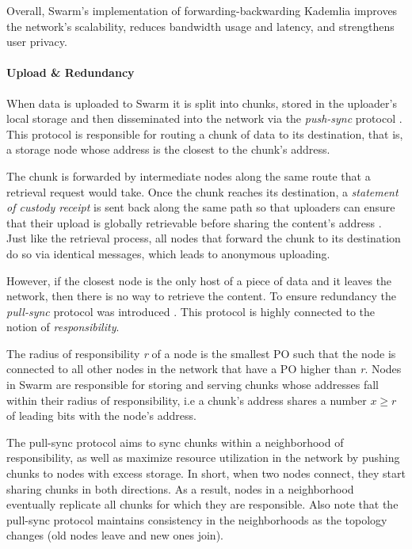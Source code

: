 Overall, Swarm's implementation of forwarding-backwarding Kademlia improves the network's scalability, reduces bandwidth usage and latency, and strengthens user privacy.

\paragraph{Upload \& Redundancy}\label{par:upload_swarm}
When data is uploaded to Swarm it is split into chunks, stored in the uploader's local storage and then disseminated into the network via the \textit{push-sync} protocol \citep{swarm_team_2021}. This protocol is responsible for routing a chunk of data to its destination, that is, a storage node whose address is the closest to the chunk's address.

The chunk is forwarded by intermediate nodes along the same route that a retrieval request would take. Once the chunk reaches its destination, a \textit{statement of custody receipt} is sent back along the same path so that uploaders can ensure that their upload is globally retrievable before sharing the content's address \citep[p.~47]{tron_2020}. Just like the retrieval process, all nodes that forward the chunk to its destination do so via identical messages, which leads to anonymous uploading.

However, if the closest node is the only host of a piece of data and it leaves the network, then there is no way to retrieve the content. To ensure redundancy the \textit{pull-sync} protocol was introduced \citep{swarm_team_2021}. This protocol is highly connected to the notion of \textit{responsibility}.

The radius of responsibility \textit{r} of a node is the smallest PO such that the node is connected to all other nodes in the network that have a PO higher than \textit{r}. Nodes in Swarm are responsible for storing and serving chunks whose addresses fall within their radius of responsibility, i.e a chunk's address shares a number $x \geq r$ of leading bits with the node's address.

The pull-sync protocol aims to sync chunks within a neighborhood of responsibility, as well as maximize resource utilization in the network by pushing chunks to nodes with excess storage. In short, when two nodes connect, they start sharing chunks in both directions. As a result, nodes in a neighborhood eventually replicate all chunks for which they are responsible. Also note that the pull-sync protocol maintains consistency in the neighborhoods as the topology changes (old nodes leave and new ones join).

